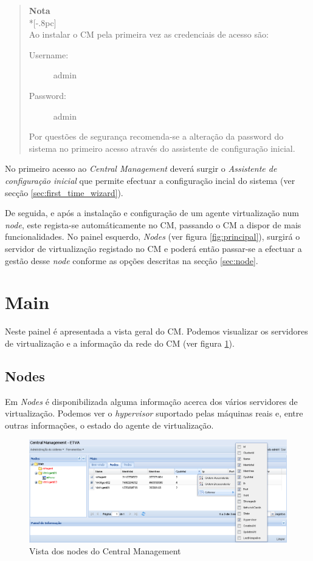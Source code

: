 \begin{quote}
	{\large \bf Nota} \\*[-.8pc]
	\underline{\hspace{6in}} \\
	Ao instalar o CM pela primeira vez as credenciais de acesso são:
	\begin{description}
        	\item[Username:] admin
	        \item[Password:] admin
	\end{description}
	Por questões de segurança recomenda-se a alteração da password do sistema no primeiro acesso através do assistente de configuração inicial.

\end{quote}

No primeiro acesso ao \emph{Central Management} deverá surgir o \emph{Assistente de configuração inicial} que permite efectuar a configuração incial do sistema (ver secção \ref{sec:first_time_wizard}).

De seguida, e após a instalação e configuração de um agente virtualização num \emph{node}, este regista-se automáticamente no CM, passando o CM a dispor de mais funcionalidades.
No painel esquerdo, \emph{Nodes} (ver figura \ref{fig:principal}), surgirá o servidor de virtualização registado no CM e poderá então passar-se a efectuar a gestão desse \emph{node} conforme as opções descritas na secção \ref{sec:node}.

\pagebreak

\section{Main}

Neste painel é apresentada a vista geral do CM.
Podemos visualizar os servidores de virtualização e a informação da rede do CM (ver figura \ref{fig:main_nodes}).

\subsection{Nodes}

Em \emph{Nodes} é disponibilizada alguma informação acerca dos vários servidores de virtualização. Podemos ver o \emph{hypervisor} suportado pelas máquinas reais e, entre outras informações, o estado do agente de virtualização.
\begin{figure}[H]
	\begin{center}
	\includegraphics[scale=0.45]{screenshots/main_nodes.png}
	\caption{Vista dos nodes do Central Management}
	\label{fig:main_nodes}
	\end{center}
\end{figure}

